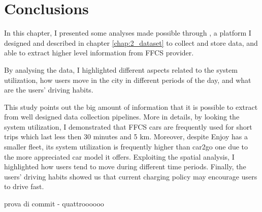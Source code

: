 \section{Conclusions}
\label{sec:3_6_conclusion}

In this chapter, I presented some analyses made possible through \tool, a platform I designed and described in chapter \ref{chap:2_dataset} to collect and store data, and able to extract higher level information from FFCS provider.

By analysing the data, I highlighted different aspects related to the system utilization, how users move in the city in different periods of the day, and what are the users' driving habits.

This study points out the big amount of information that it is possible to extract from well designed data collection pipelines. More in details, by looking the system utilization, I demonstrated that FFCS cars are frequently used for short trips which last less then 30 minutes and 5 km. Moreover, despite Enjoy has a smaller fleet, its system utilization is frequently higher than car2go one due to the more appreciated car model it offers. Exploiting the spatial analysis, I highlighted how users tend to move during different time periods. Finally, the users' driving habits showed us that current charging policy may encourage users to drive fast. 

prova di commit - quattroooooo